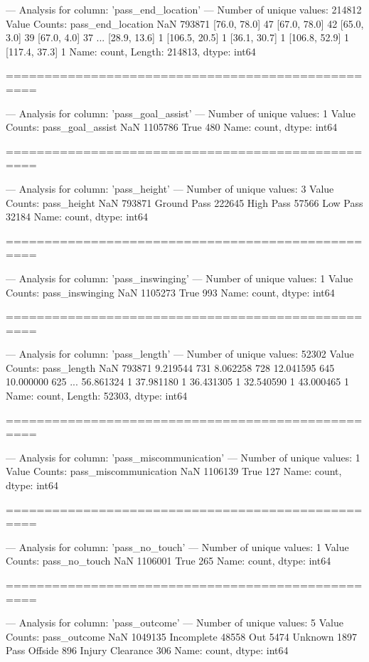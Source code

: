 --- Analysis for column: 'pass_end_location' ---
Number of unique values: 214812
Value Counts:
pass_end_location
NaN              793871
[76.0, 78.0]         47
[67.0, 78.0]         42
[65.0, 3.0]          39
[67.0, 4.0]          37
                  ...  
[28.9, 13.6]          1
[106.5, 20.5]         1
[36.1, 30.7]          1
[106.8, 52.9]         1
[117.4, 37.3]         1
Name: count, Length: 214813, dtype: int64

==================================================

--- Analysis for column: 'pass_goal_assist' ---
Number of unique values: 1
Value Counts:
pass_goal_assist
NaN     1105786
True        480
Name: count, dtype: int64

==================================================

--- Analysis for column: 'pass_height' ---
Number of unique values: 3
Value Counts:
pass_height
NaN            793871
Ground Pass    222645
High Pass       57566
Low Pass        32184
Name: count, dtype: int64

==================================================

--- Analysis for column: 'pass_inswinging' ---
Number of unique values: 1
Value Counts:
pass_inswinging
NaN     1105273
True        993
Name: count, dtype: int64

==================================================

--- Analysis for column: 'pass_length' ---
Number of unique values: 52302
Value Counts:
pass_length
NaN          793871
9.219544        731
8.062258        728
12.041595       645
10.000000       625
              ...  
56.861324         1
37.981180         1
36.431305         1
32.540590         1
43.000465         1
Name: count, Length: 52303, dtype: int64

==================================================

--- Analysis for column: 'pass_miscommunication' ---
Number of unique values: 1
Value Counts:
pass_miscommunication
NaN     1106139
True        127
Name: count, dtype: int64

==================================================

--- Analysis for column: 'pass_no_touch' ---
Number of unique values: 1
Value Counts:
pass_no_touch
NaN     1106001
True        265
Name: count, dtype: int64

==================================================

--- Analysis for column: 'pass_outcome' ---
Number of unique values: 5
Value Counts:
pass_outcome
NaN                 1049135
Incomplete            48558
Out                    5474
Unknown                1897
Pass Offside            896
Injury Clearance        306
Name: count, dtype: int64

